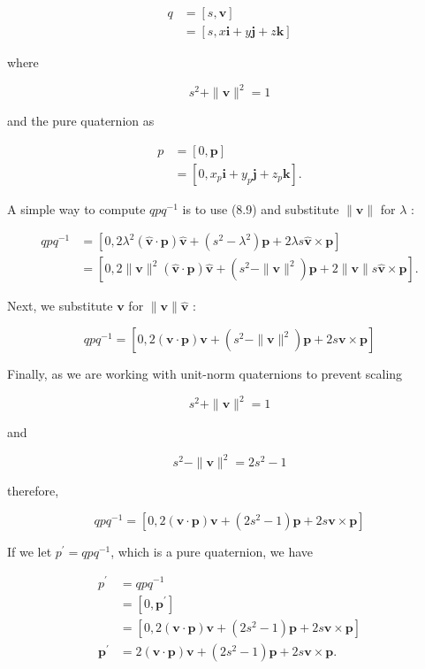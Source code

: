 \documentclass[10pt]{article}
\begin{document}
$$
\begin{aligned}
q & =[s, \mathbf{v}] \\
& =[s, x \mathbf{i}+y \mathbf{j}+z \mathbf{k}]
\end{aligned}
$$

where

$$
s^{2}+\|\mathbf{v}\|^{2}=1
$$

and the pure quaternion as

$$
\begin{aligned}
p & =[0, \mathbf{p}] \\
& =\left[0, x_{p} \mathbf{i}+y_{p} \mathbf{j}+z_{p} \mathbf{k}\right] .
\end{aligned}
$$

A simple way to compute $q p q^{-1}$ is to use (8.9) and substitute $\|\mathbf{v}\|$ for $\lambda$ :

$$
\begin{aligned}
q p q^{-1} & =\left[0,2 \lambda^{2}(\hat{\mathbf{v}} \cdot \mathbf{p}) \hat{\mathbf{v}}+\left(s^{2}-\lambda^{2}\right) \mathbf{p}+2 \lambda s \hat{\mathbf{v}} \times \mathbf{p}\right] \\
& =\left[0,2\|\mathbf{v}\|^{2}(\hat{\mathbf{v}} \cdot \mathbf{p}) \hat{\mathbf{v}}+\left(s^{2}-\|\mathbf{v}\|^{2}\right) \mathbf{p}+2\|\mathbf{v}\| s \hat{\mathbf{v}} \times \mathbf{p}\right] .
\end{aligned}
$$

Next, we substitute $\mathbf{v}$ for $\|\mathbf{v}\| \hat{\mathbf{v}}$ :

$$
q p q^{-1}=\left[0,2(\mathbf{v} \cdot \mathbf{p}) \mathbf{v}+\left(s^{2}-\|\mathbf{v}\|^{2}\right) \mathbf{p}+2 s \mathbf{v} \times \mathbf{p}\right]
$$

Finally, as we are working with unit-norm quaternions to prevent scaling

$$
s^{2}+\|\mathbf{v}\|^{2}=1
$$

and

$$
s^{2}-\|\mathbf{v}\|^{2}=2 s^{2}-1
$$

therefore,

$$
q p q^{-1}=\left[0,2(\mathbf{v} \cdot \mathbf{p}) \mathbf{v}+\left(2 s^{2}-1\right) \mathbf{p}+2 s \mathbf{v} \times \mathbf{p}\right]
$$

If we let $p^{\prime}=q p q^{-1}$, which is a pure quaternion, we have

$$
\begin{aligned}
p^{\prime} & =q p q^{-1} \\
& =\left[0, \mathbf{p}^{\prime}\right] \\
& =\left[0,2(\mathbf{v} \cdot \mathbf{p}) \mathbf{v}+\left(2 s^{2}-1\right) \mathbf{p}+2 s \mathbf{v} \times \mathbf{p}\right] \\
\mathbf{p}^{\prime} & =2(\mathbf{v} \cdot \mathbf{p}) \mathbf{v}+\left(2 s^{2}-1\right) \mathbf{p}+2 s \mathbf{v} \times \mathbf{p} .
\end{aligned}
$$
\end{document}
